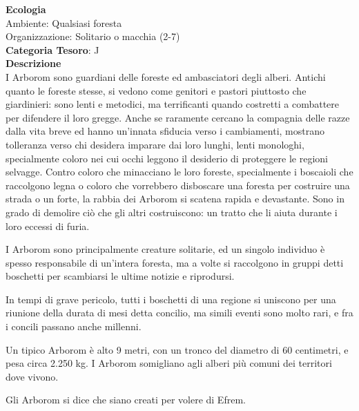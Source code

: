\begin{multicols}{2}
{\textbf{Ecologia}\\
Ambiente: Qualsiasi foresta\\
Organizzazione: Solitario o macchia (2-7)\\
\textbf{Categoria Tesoro}: J\\
\textbf{Descrizione}\\
I Arborom sono guardiani delle foreste ed ambasciatori degli alberi. Antichi quanto le foreste stesse, si vedono come genitori e pastori piuttosto che giardinieri: sono lenti e metodici, ma terrificanti quando costretti a combattere per difendere il loro gregge. Anche se raramente cercano la compagnia delle razze dalla vita breve ed hanno un'innata sfiducia verso i cambiamenti, mostrano tolleranza verso chi desidera imparare dai loro lunghi, lenti monologhi, specialmente coloro nei cui occhi leggono il desiderio di proteggere le regioni selvagge. Contro coloro che minacciano le loro foreste, specialmente i boscaioli che raccolgono legna o coloro che vorrebbero disboscare una foresta per costruire una strada o un forte, la rabbia dei Arborom si scatena rapida e devastante. Sono in grado di demolire ciò che gli altri costruiscono: un tratto che li aiuta durante i loro eccessi di furia.

I Arborom sono principalmente creature solitarie, ed un singolo individuo è spesso responsabile di un'intera foresta, ma a volte si raccolgono in gruppi detti boschetti per scambiarsi le ultime notizie e riprodursi.

In tempi di grave pericolo, tutti i boschetti di una regione si uniscono per una riunione della durata di mesi detta concilio, ma simili eventi sono molto rari, e fra i concili passano anche millenni.

Un tipico Arborom è alto 9 metri, con un tronco del diametro di 60 centimetri, e pesa circa 2.250 kg. I Arborom somigliano agli alberi più comuni dei territori dove vivono.

Gli Arborom si dice che siano creati per volere di Efrem.

}
\end{multicols}
